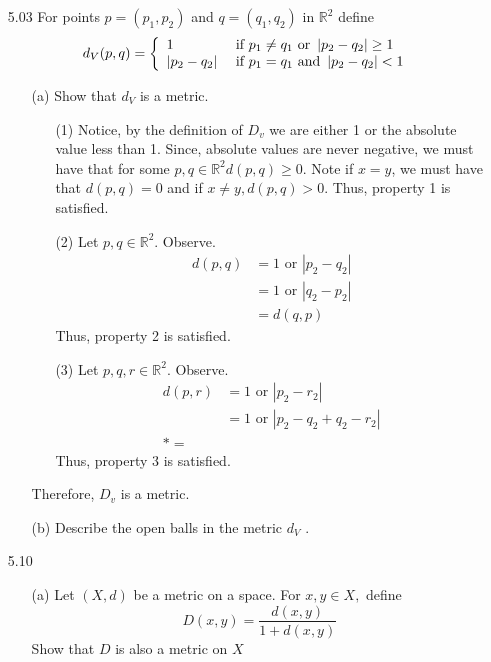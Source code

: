 \documentclass[12pt]{article}
\newcommand{\R}{\mathbb{R}}
\begin{document}
\begin{enumerate}
	\item[5.03] For points $p = \left( p _ { 1 } , p _ { 2 } \right)$ and $q = \left( q _ { 1 } , q _ { 2 } \right)$ in $\mathbb { R } ^ { 2 }$ define
		\[d _ { V } ( p , q ) = \left\{ \begin{array} { l l } { 1 } & { \text { if } p _ { 1 } \neq q _ { 1 } \text { or } \left| p _ { 2 } - q _ { 2 } \right| \geq 1 } \\ { \left| p _ { 2 } - q _ { 2 } \right| } & { \text { if } p _ { 1 } = q _ { 1 } \text { and } \left| p _ { 2 } - q _ { 2 } \right| < 1 } \end{array} \right.\]
	\begin{enumerate}
		\item[(a)] Show that $d _ { V }$ is a metric.
		\begin{enumerate}
			\item[(1)]
			Notice, by the definition of $ D_v $ we are either 1 or the absolute value less than 1. Since, absolute values are never negative, we must have that for some $ p,q\in \R^2 d(p,q)\geq0$. Note if $ x = y $, we must have that $ d(p,q)=0 $ and if $ x\not=y,d(p,q)>0 $.
			Thus, property 1 is satisfied.
			\item[(2)] Let $ p,q\in\R^2 $. Observe.
				\begin{align*}
					d(p,q) &= 1 \text{ or } |p_2-q_2|\\
						   &= 1 \text{ or } |q_2-p_2|\\
						   &= d(q,p)
				\end{align*}
			Thus, property 2 is satisfied.
			\item[(3)] Let $ p,q,r\in\R^2 $. Observe.
				\begin{align*}
					d(p,r) &=1 \text{ or } |p_2-r_2|\\
						   &=1 \text{ or } |p_2-q_2+q_2-r_2|\\
						   *=
				\end{align*}
			Thus, property 3 is satisfied.
		\end{enumerate}
		Therefore, $ D_v $ is a metric.
		\item[(b)] 	Describe the open balls in the metric $d _ { V }$ .
	\end{enumerate}
	\item[5.10]
	\begin{enumerate}
		\item[(a)] Let $( X , d )$ be a metric on a space. For $x , y \in X ,$ define
		\[D ( x , y ) = \frac { d ( x , y ) } { 1 + d ( x , y ) }\]
		Show that $D$ is also a metric on $ X $

\end{enumerate}
\end{enumerate}
\end{document}
